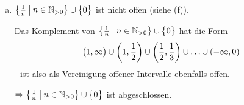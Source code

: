 \documentclass{scrreprt}
\begin{document}
\begin{enumerate}[(a)]
\item $\qty{\frac{1}{n} \: \middle | \: n \in \mathbb{N}_{>0}} \cup \qty\big{0}$
  ist nicht offen (siehe (f)).

  Das Komplement von
  $\qty{\frac{1}{n} \: \middle | \: n \in \mathbb{N}_{>0}} \cup \qty\big{0}$
  hat die Form
  \[
    \qty\big(1, \infty) \cup \qty(1, \frac{1}{2}) \cup
    \qty(\frac{1}{2}, \frac{1}{3}) \cup \ldots
    \cup \qty(-\infty, 0)
  \]
  - ist also als Vereinigung offener Intervalle ebenfalls offen.

  $\Rightarrow \qty{\frac{1}{n} \: \middle | \: n \in \mathbb{N}_{>0}}
  \cup \qty\big{0}$ ist abgeschlossen.
\end{enumerate}
\end{document}
